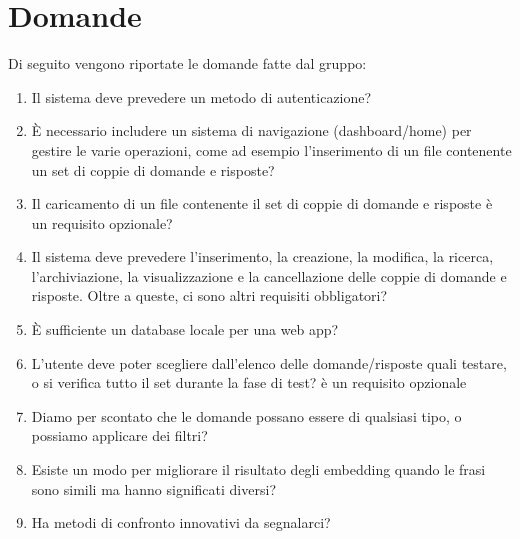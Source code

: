 \documentclass[a4paper, 12pt]{article}
\begin{document}
\newpage

\section{Domande}
Di seguito vengono riportate le domande fatte dal gruppo:
\begin{enumerate}
    \item Il sistema deve prevedere un metodo di autenticazione?
    \item È necessario includere un sistema di navigazione (dashboard/home) per gestire le varie operazioni, come ad esempio l'inserimento di un file contenente un set di coppie di domande e risposte?
    \item Il caricamento di un file contenente il set di coppie di domande e risposte è un requisito opzionale?
    \item Il sistema deve prevedere l'inserimento, la creazione, la modifica, la ricerca, l'archiviazione, la visualizzazione e la cancellazione delle coppie di domande e risposte. Oltre a queste, ci sono altri requisiti obbligatori?
    \item È sufficiente un database locale per una web app?
    \item L'utente deve poter scegliere dall'elenco delle domande/risposte quali testare, o si verifica tutto il set durante la fase di test? è un requisito opzionale
    \item Diamo per scontato che le domande possano essere di qualsiasi tipo, o possiamo applicare dei filtri?
    \item Esiste un modo per migliorare il risultato degli embedding quando le frasi sono simili ma hanno significati diversi?
    \item Ha metodi di confronto innovativi da segnalarci?
\end{enumerate}
\end{document}

